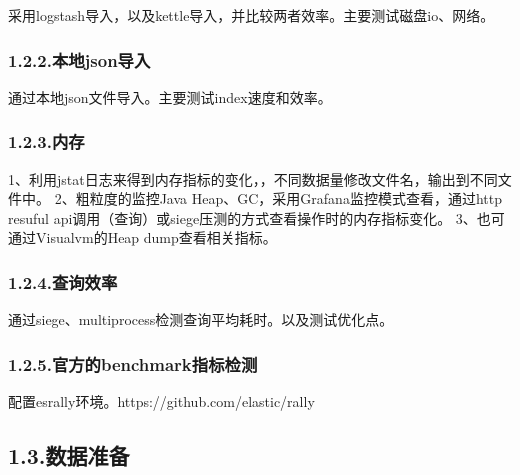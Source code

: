 \documentclass{article}
\begin{document}
\noindent{}采用logstash导入，以及kettle导入，并比较两者效率。主要测试磁盘io、网络。%

\subsubsection{1.2.2.\hspace*{0.5em}本地json导入}\label{sec-json}%

\noindent{}通过本地json文件导入。主要测试index速度和效率。%

\subsubsection{1.2.3.\hspace*{0.5em}内存}\label{section}%

\noindent{}1、利用jstat日志来得到内存指标的变化，，不同数据量修改文件名，输出到不同文件中。    \mdbr
{}2、粗粒度的监控Java Heap、GC，采用Grafana监控模式查看，通过http resuful api调用（查询）或siege压测的方式查看操作时的内存指标变化。    \mdbr
{}3、也可通过Visualvm的Heap dump查看相关指标。%

\subsubsection{1.2.4.\hspace*{0.5em}查询效率}\label{section}%

\noindent{}通过siege、multiprocess检测查询平均耗时。以及测试优化点。%

\subsubsection{1.2.5.\hspace*{0.5em}官方的benchmark指标检测}\label{sec-benchmark}%

\noindent{}配置esrally环境。https://github.com/elastic/rally%

\subsection{1.3.\hspace*{0.5em}数据准备}\label{section}%
\end{document}
